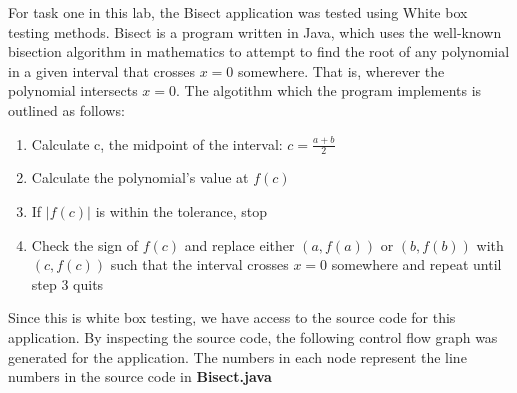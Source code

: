 For task one in this lab, the Bisect application was tested using White box
testing methods. Bisect is a program written in Java, which
uses the well-known bisection algorithm in mathematics to attempt to find the
root of any polynomial in a given interval that crosses $x=0$ somewhere. That
is, wherever the polynomial intersects $x=0$.
The algotithm which the program implements is outlined as follows:

\begin{enumerate}
  \item Calculate c, the midpoint of the interval: $ c = \frac{a+b}{2} $
  \item Calculate the polynomial's value at $f(c)$
  \item If $|f(c)|$ is within the tolerance, stop
  \item Check the sign of $f(c)$ and replace either $(a, f(a))$ or $(b, f(b))$
    with $(c, f(c))$ such that the interval crosses $x=0$ somewhere and repeat
    until step 3 quits
\end{enumerate}

Since this is white box testing, we have access to the source code for this
application. By inspecting the source code, the following control flow graph was
generated for the application. The numbers in each node represent the line
numbers in the source code in \textbf{Bisect.java}

\begin{adjustbox}{center, height=\textheight}
\end{adjustbox}

